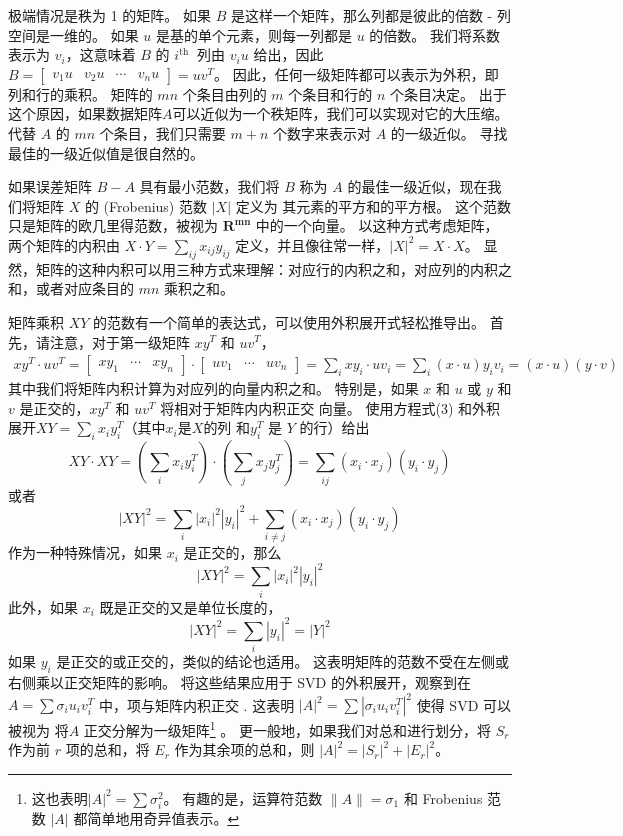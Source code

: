 \documentclass[11pt,a4paper,twoside]{article}
\begin{document}
\begin{CJK}{UTF8}{gbsn}
极端情况是秩为 1 的矩阵。 如果 $B$ 是这样一个矩阵，那么列都是彼此的倍数 - 列空间是一维的。 如果 $u$ 是基的单个元素，则每一列都是 $u$ 的倍数。 我们将系数表示为 $v_{i}$，这意味着 $B$ 的 $i^{\text {th }}$ 列由 $v_{i} u$ 给出，因此 $B=\left[ \begin{array}{llll}v_{1} u & v_{2} u & \cdots & v_{n} u\end{array}\right]=u v^{T}$。 因此，任何一级矩阵都可以表示为外积，即列和行的乘积。 矩阵的 $m n$ 个条目由列的 $m$ 个条目和行的 $n$ 个条目决定。 出于这个原因，如果数据矩阵$A$可以近似为一个秩矩阵，我们可以实现对它的大压缩。 代替 $A$ 的 $m n$ 个条目，我们只需要 $m+n$ 个数字来表示对 $A$ 的一级近似。 寻找最佳的一级近似值是很自然的。

如果误差矩阵 $B-A$ 具有最小范数，我们将 $B$ 称为 $A$ 的最佳一级近似，现在我们将矩阵 $X$ 的 (Frobenius) 范数 $|X|$ 定义为 其元素的平方和的平方根。 这个范数只是矩阵的欧几里得范数，被视为 $\mathbf{R}^{\mathbf{m n}}$ 中的一个向量。 以这种方式考虑矩阵，两个矩阵的内积由 $X \cdot Y=\sum_{i j} x_{i j} y_{i j}$ 定义，并且像往常一样，$|X|^{2}=X \cdot X$。 显然，矩阵的这种内积可以用三种方式来理解：对应行的内积之和，对应列的内积之和，或者对应条目的 $m n$ 乘积之和。

矩阵乘积 $X Y$ 的范数有一个简单的表达式，可以使用外积展开式轻松推导出。 首先，请注意，对于第一级矩阵 $x y^{T}$ 和 $u v^{T}$，
\begin{align}
x y^{T} \cdot u v^{T}=\left[\begin{array}{lll}
x y_{1} & \cdots & x y_{n}
\end{array}\right] \cdot\left[\begin{array}{lll}
u v_{1} & \cdots & u v_{n}
\end{array}\right]=\sum_{i} x y_{i} \cdot u v_{i}=\sum_{i}(x \cdot u) y_{i} v_{i}=(x \cdot u)(y \cdot v)
\end{align}
其中我们将矩阵内积计算为对应列的向量内积之和。 特别是，如果 $x$ 和 $u$ 或 $y$ 和 $v$ 是正交的，$x y^{T}$ 和 $u v^{T}$ 将相对于矩阵内内积正交 向量。 使用方程式(3) 和外积展开$X Y=\sum_{i} x_{i} y_{i}^{T}$（其中$x_{i}$是$X$的列 和$y_{i}^{T}$ 是 $Y$ 的行）给出
$$
X Y \cdot X Y=\left(\sum_{i} x_{i} y_{i}^{T}\right) \cdot\left(\sum_{j} x_{j} y_{j}^{T}\right)=\sum_{i j}\left(x_{i} \cdot x_{j}\right)\left(y_{i} \cdot y_{j}\right)
$$
或者
$$
|X Y|^{2}=\sum_{i}\left|x_{i}\right|^{2}\left|y_{i}\right|^{2}+\sum_{i \neq j}\left(x_{i} \cdot x_{j}\right)\left(y_{i} \cdot y_{j}\right)
$$
作为一种特殊情况，如果 $x_{i}$ 是正交的，那么
$$
|X Y|^{2}=\sum_{i}\left|x_{i}\right|^{2}\left|y_{i}\right|^{2}
$$
此外，如果 $x_{i}$ 既是正交的又是单位长度的，
$$
|X Y|^{2}=\sum_{i}\left|y_{i}\right|^{2}=|Y|^{2}
$$
如果 $y_{i}$ 是正交的或正交的，类似的结论也适用。 这表明矩阵的范数不受在左侧或右侧乘以正交矩阵的影响。 将这些结果应用于 SVD 的外积展开，观察到在 $A=\sum \sigma_{i} u_{i} v_{i}^{T}$ 中，项与矩阵内积正交 . 这表明 $|A|^{2}=\sum\left|\sigma_{i} u_{i} v_{i}^{T}\right|^{2}$ 使得 SVD 可以被视为 将$A$ 正交分解为一级矩阵\footnote{这也表明$|A|^{2}=\sum \sigma_{i}^{2}$。 有趣的是，运算符范数 $\|A\|=\sigma_{1}$ 和 Frobenius 范数 $|A|$ 都简单地用奇异值表示。} 。 更一般地，如果我们对总和进行划分，将 $S_{r}$ 作为前 $r$ 项的总和，将 $E_{r}$ 作为其余项的总和，则 $|A|^{2} =\left|S_{r}\right|^{2}+\left|E_{r}\right|^{2}$。


\end{CJK}
\end{document}
